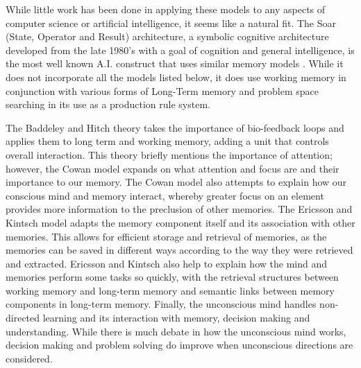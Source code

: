While little work
has been done in applying these models to any aspects of computer science or
artificial intelligence, it seems like a natural fit. The Soar (State, Operator and Result) architecture, a 
symbolic cognitive architecture developed from the late 1980's with a goal of cognition
and general intelligence, is the most well known A.I. construct that uses similar 
memory models \cite{SOAR}. While it does not incorporate all the models listed below,
it does use working memory in conjunction with various forms of Long-Term memory and
problem space searching in its use as a production rule system\cite{SOAR2}. 

The Baddeley and Hitch
theory takes the importance of bio-feedback loops and applies them to long term
and working memory, adding a unit that controls overall interaction.  This
theory briefly mentions the importance of attention; however, the Cowan model
expands on what attention and focus are and their importance to our memory.
The Cowan model also attempts to explain how our conscious mind and memory
interact, whereby greater focus on an element provides more information to the
preclusion of other memories. The Ericsson and Kintsch model adapts the memory
component itself and its association with other memories. This allows for
efficient storage and retrieval of memories, as the memories can be saved in
different ways according to the way they were retrieved and extracted.  Ericsson
and Kintsch also help to explain how the mind and memories perform some tasks so
quickly, with the retrieval structures between working memory and long-term
memory and semantic links between memory components in long-term memory.
Finally, the unconscious mind handles non-directed learning and its interaction
with memory, decision making and understanding. While there is much debate in
how the unconscious mind works, decision making and problem solving do improve
when unconscious directions are considered.
